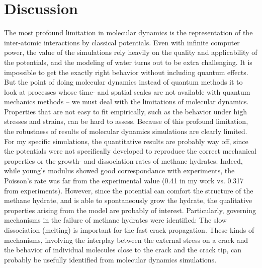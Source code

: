 \section{Discussion}

The most profound limitation in molecular dynamics is the representation of the inter-atomic interactions by classical potentials. Even with infinite computer power, the value of the simulations rely heavily on the quality and applicability of the potentials, and the modeling of water turns out to be extra challenging. It is impossible to get the exactly right behavior without including quantum effects. But the point of doing molecular dynamics instead of quantum methods it to look at processes whose time- and spatial scales are not available with quantum mechanics methods -- we must deal with the limitations of molecular dynamics. Properties that are not easy to fit empirically, such as the behavior under high stresses and strains, can be hard to assess. Because of this profound limitation, the robustness of results of molecular dynamics simulations are clearly limited. For my specific simulations, the quantitative results are probably way off, since the potentials were not specifically developed to reproduce the correct mechanical properties or the growth- and dissociation rates of methane hydrates. Indeed, while young's modulus showed good correspondance with experiments, the Poisson's rate was far from the experimental value (0.41 in my work vs. 0.317 from experiments). However, since the potential can comfort the structure of the methane hydrate, and is able to spontaneously grow the hydrate, the qualitative properties arising from the model are probably of interest. Particularly, governing mechanisms in the failure of methane hydrates were identified: The slow dissociation (melting) is important for the fast crack propagation. These kinds of mechanisms,  involving the interplay between the external stress on a crack and the behavior of individual molecules close to the crack and the crack tip, can probably be usefully identified from molecular dynamics simulations.

